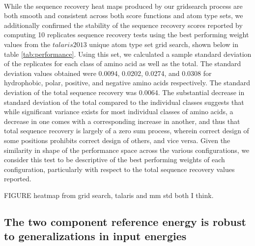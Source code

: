 \paragraph{}
While the sequence recovery heat maps produced by our gridsearch process are both smooth and consistent across both score functions and atom type sets, we additionally confirmed the stability of the sequence recovery scores reported by computing 10 replicates sequence recovery tests using the best performing weight values from the $talaris2013$ unique atom type set grid search, shown below in table \ref{tab:performance}.
Using this set, we calculated a sample standard deviation of the replicates for each class of amino acid as well as the total. 
The standard deviation values obtained were 0.0094, 0.0202, 0.0274, and 0.0308 for hydrophobic, polar, positive, and negative amino acids respectively.
The standard deviation of the total sequence recovery was 0.0064.
The substantial decrease in standard deviation of the total compared to the individual classes suggests that while significant variance exists for most individual classes of amino acids, a decrease in one comes with a corresponding increase in another, and thus that total sequence recovery is largely of a zero sum process, wherein correct design of some positions prohibits correct design of others, and vice versa.
Given the similarity in shape of the performance space across the various configurations, we consider this test to be descriptive of the best performing weights of each configuration, particularly with respect to the total sequence recovery values reported.


FIGURE heatmap from grid search, talaris and mm std both I think.

\subsection{The two component reference energy is robust to generalizations in input energies}
